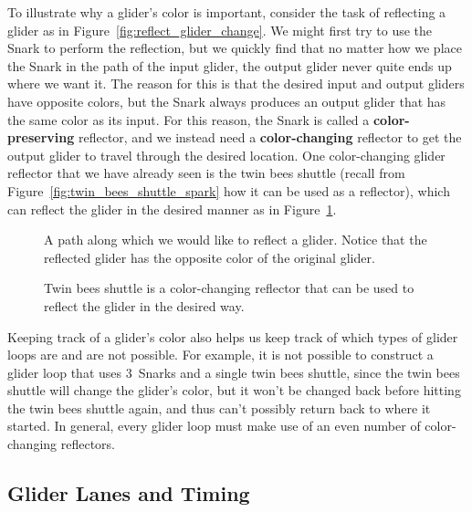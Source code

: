 To illustrate why a glider's color is important, consider the task of reflecting a glider as in Figure~\ref{fig:reflect_glider_change}. We might first try to use the Snark to perform the reflection, but we quickly find that no matter how we place the Snark in the path of the input glider, the output glider never quite ends up where we want it. The reason for this is that the desired input and output gliders have opposite colors, but the Snark always produces an output glider that has the same color as its input. For this reason, the Snark is called a \textbf{color-preserving} reflector, and we instead need a \textbf{color-changing} reflector to get the output glider to travel through the desired location. One color-changing glider reflector that we have already seen is the twin bees shuttle (recall from Figure~\ref{fig:twin_bees_shuttle_spark} how it can be used as a reflector), which can reflect the glider in the desired manner as in Figure~\ref{fig:reflect_glider_change_bees}.

\begin{figure}[!htb]
	\centering
	\begin{minipage}[b]{.41\textwidth}
		\centering
		\caption{A path along which we would like to reflect a glider. Notice that the reflected glider has the opposite color of the original glider.}\label{fig:reflect_glider_change}
	\end{minipage} \hfill %
	\begin{minipage}[b]{.55\textwidth}
		\centering
		\caption{Twin bees shuttle is a color-changing reflector that can be used to reflect the glider in the desired way.}\label{fig:reflect_glider_change_bees}
	\end{minipage}
\end{figure}

Keeping track of a glider's color also helps us keep track of which types of glider loops are and are not possible. For example, it is not possible to construct a glider loop that uses 3~Snarks and a single twin bees shuttle, since the twin bees shuttle will change the glider's color, but it won't be changed back before hitting the twin bees shuttle again, and thus can't possibly return back to where it started. In general, every glider loop must make use of an even number of color-changing reflectors.


\subsection{Glider Lanes and Timing}\label{sec:glider_lanes}


